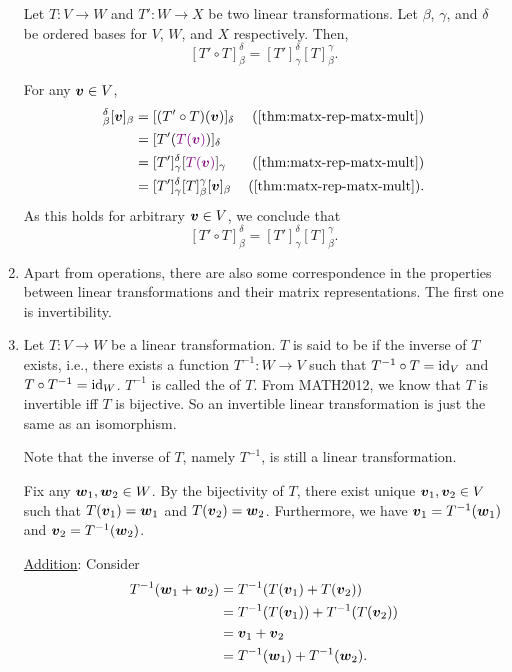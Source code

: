 \begin{enumerate}
\begin{theorem}
\label{thm:lt-compo-matx-mult}
Let \(T:V\to W\) and \(T':W\to X\) be two linear transformations. Let
\(\beta\), \(\gamma\), and \(\delta\) be ordered bases for \(V\), \(W\), and
\(X\) respectively. Then,
\[
[T'\circ T]_{\beta}^{\delta}=[T']_{\gamma}^{\delta}[T]_{\beta}^{\gamma}.
\]
\end{theorem}
\begin{pf}
For any \(\vb*{v}\in V\),
\begin{align*}
[T'\circ T]_{\beta}^{\delta}[\vect{v}]_{\beta}
&=[(T'\circ T)(\vect{v})]_{\delta}&\text{(\Cref{thm:matx-rep-matx-mult})} \\
&=[T'(\vc{T(\vect{v})})]_{\delta} \\
&=[T']_{\gamma}^{\delta}[\vc{T(\vect{v})}]_{\gamma}&\text{(\Cref{thm:matx-rep-matx-mult})} \\
&=[T']_{\gamma}^{\delta}[T]_{\beta}^{\gamma}[\vect{v}]_{\beta}&\text{(\Cref{thm:matx-rep-matx-mult})}.
\end{align*}
As this holds for arbitrary \(\vb*{v}\in V\), we conclude that
\[
[T'\circ T]_{\beta}^{\delta}=[T']_{\gamma}^{\delta}[T]_{\beta}^{\gamma}.
\]
\end{pf}

\item Apart from operations, there are also some correspondence in the
properties between linear transformations and their matrix representations. The
first one is invertibility.

\item Let \(T:V\to W\) be a linear transformation. \(T\) is said to be
 if the inverse of \(T\) exists, i.e., there exists a function
\(T^{-1}:W\to V\) such that \(T^{-1}\circ T=\operatorname{id}_{V}\) and \(T\circ
T^{-1}=\operatorname{id}_{W}\). \(T^{-1}\) is called the  of \(T\). From
MATH2012, we know that \(T\) is invertible iff \(T\) is bijective. So an
invertible linear transformation is just the same as an isomorphism.

Note that the inverse of \(T\), namely \(T^{-1}\), is still a linear
transformation.

\begin{pf}
Fix any \(\vb*{w}_1,\vb*{w}_2\in W\). By the bijectivity of \(T\), there exist unique
\(\vb*{v}_1,\vb*{v}_2\in V\) such that \(T(\vb*{v}_1)=\vb*{w}_1\) and
\(T(\vb*{v}_2)=\vb*{w}_2\). Furthermore, we have
\(\vb*{v}_1=T^{-1}(\vb*{w}_1)\) and \(\vb*{v}_2=T^{-1}(\vb*{w}_2)\).

\underline{Addition}: Consider
\begin{align*}
T^{-1}(\vb*{w}_1+\vb*{w}_2)&=T^{-1}(T(\vb*{v}_1)+T(\vb*{v}_2)) \\
&=T^{-1}(T(\vb*{v}_1))+T^{-1}(T(\vb*{v}_2)) \\
&=\vb*{v}_1+\vb*{v}_2 \\
&=T^{-1}(\vb*{w}_1)+T^{-1}(\vb*{w}_2).
\end{align*}


\end{pf}
\end{enumerate}
